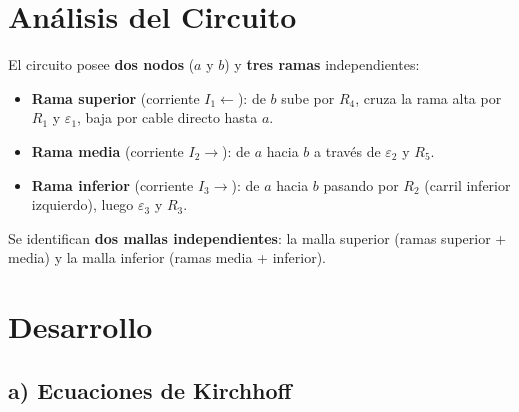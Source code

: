 \documentclass[12pt,letterpaper]{article}
\begin{document}
\section*{An\'alisis del Circuito}

El circuito posee \textbf{dos nodos} ($a$ y $b$) y \textbf{tres ramas} independientes:

\begin{itemize}
    \item \textbf{Rama superior} (corriente $I_1 \leftarrow$): de $b$ sube por
          \textcolor{colR4}{$R_4$}, cruza la rama alta por
          \textcolor{colR1}{$R_1$} y \textcolor{colE1}{$\varepsilon_1$},
          baja por cable directo hasta $a$.
    \item \textbf{Rama media} (corriente $I_2 \rightarrow$): de $a$ hacia $b$
          a trav\'es de \textcolor{colE2}{$\varepsilon_2$} y
          \textcolor{colR5}{$R_5$}.
    \item \textbf{Rama inferior} (corriente $I_3 \rightarrow$): de $a$ hacia $b$
          pasando por \textcolor{colR2}{$R_2$} (carril inferior izquierdo),
          luego \textcolor{colE3}{$\varepsilon_3$} y \textcolor{colR3}{$R_3$}.
\end{itemize}

Se identifican \textbf{dos mallas independientes}: la malla superior (ramas superior + media)
y la malla inferior (ramas media + inferior).

\section*{Desarrollo}

\subsection*{a) Ecuaciones de Kirchhoff}
\end{document}

